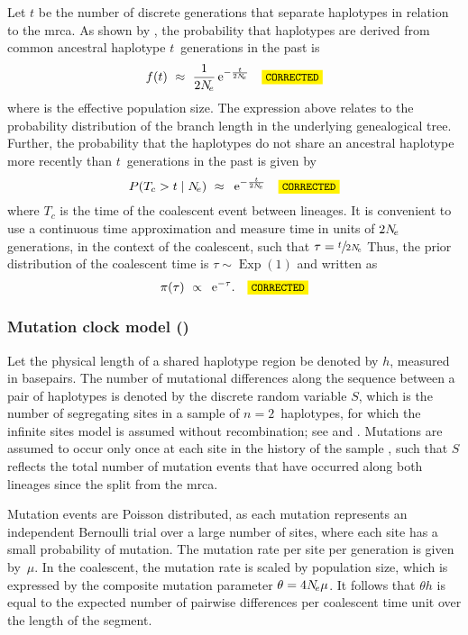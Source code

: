 Let $t$ be the number of discrete generations that separate  haplotypes in relation to the \gls{mrca}.
As shown by \citet{Tajima:1983bt}, the probability that  haplotypes are derived from  common ancestral haplotype $t$~generations in the past is
\begin{equation*}
	f(t) ~\approx~ \frac{1}{2\Ne} \euler{-\frac{t}{2\Ne}} \CorrectLabel
\end{equation*}
where \Ne is the effective population size.
The expression above relates to the probability distribution of the branch length in the underlying genealogical tree.
Further, the probability that the  haplotypes do not share an ancestral haplotype more recently than $t$~generations in the past is given by
\begin{equation*}
	P(T_c > t \mid \Ne) ~\approx~ \euler{-\frac{t}{2\Ne}} \CorrectLabel
\end{equation*}
where $T_c$ is the time of the coalescent event between  lineages.
It is convenient to use a continuous time approximation and measure time in units of ${2N_{\!e}}$ generations, in the context of the coalescent, such that ${\tau = \sfrac{t}{2N_{\!e}}}$
Thus, the prior distribution of the coalescent time is ${\tau\sim\operatorname{Exp}(1)}$ and written as
\begin{equation*}
	\pi(\tau) ~\propto~ \euler{-\tau}\text{.}\CorrectLabel
\end{equation*}


%
\subsubsection{Mutation clock model (\ClockM)}\label{sec:mut_clock}
%


Let the physical length of a shared haplotype region be denoted by $h$, measured in basepairs.
The number of mutational differences along the sequence between a pair of haplotypes is denoted by the discrete random variable $S$, which is the number of segregating sites in a sample of ${n=2}$~haplotypes, for which the infinite sites model is assumed without recombination; \eg see \citet{Watterson:1975ur} and \citet{Tavare:1997vra}.
Mutations are assumed to occur only once at each site in the history of the sample \citep{Kimura:1969tn}, such that $S$ reflects the total number of mutation events that have occurred along both lineages since the split from the \gls{mrca}.

Mutation events are Poisson distributed, as each mutation represents an independent Bernoulli trial over a large number of sites, where each site has a small probability of mutation.
The mutation rate per site per generation is given by~$\mu$.
In the coalescent, the mutation rate is scaled by population size, which is expressed by the composite mutation parameter ${\theta = 4N_{\!e}\mu}$.
It follows that ${\theta h}$ is equal to the expected number of pairwise differences per coalescent time unit over the length of the segment.

